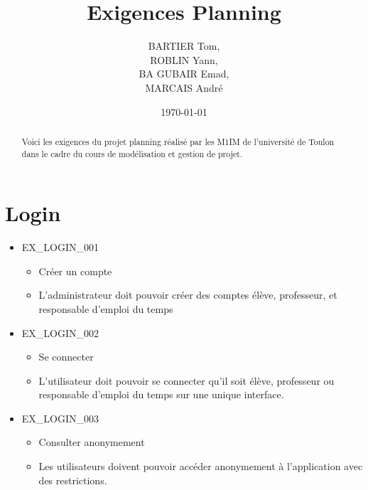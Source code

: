 \documentclass[french]{scrartcl}
\title{Exigences Planning}
\author{BARTIER Tom,\\ ROBLIN Yann,\\ BA GUBAIR Emad,\\ MARCAIS André}
\date{\today}
\begin{document}
\maketitle

\begin{abstract}
Voici les exigences du projet planning réalisé par les M1IM de l'université
de Toulon dans le cadre du cours de modélisation et gestion de projet.
\end{abstract}

\section{Login}
\begin{itemize}
    \item EX\_LOGIN\_001
        \begin{itemize}
            \item Créer un compte
            \item L'administrateur doit pouvoir créer des comptes élève, professeur, et responsable d'emploi du temps
        \end{itemize}
    
    \item EX\_LOGIN\_002
        \begin{itemize}
            \item Se connecter
            \item L'utilisateur doit pouvoir se connecter qu'il soit élève, professeur ou responsable d'emploi du temps sur une unique interface.
        \end{itemize}

    \item EX\_LOGIN\_003
        \begin{itemize}
            \item Consulter anonymement
            \item Les utilisateurs doivent pouvoir accéder anonymement à l'application avec des restrictions.
        \end{itemize}
\end{itemize}
\end{document}
